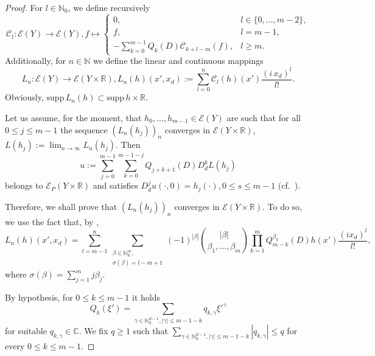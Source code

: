 \documentclass[a4paper,10pt]{amsart}
\newtheorem*{crucial lemma}{Lemma \ref{lem:nice polynomial2}}
\theoremstyle{definition}
\newcommand{\R}{\mathbb{R}}
\newcommand{\C}{\mathbb{C}}
\newcommand{\N}{\mathbb{N}}
\newcommand{\supp}{\mbox{supp}\,}
\begin{document}
\begin{proof}
    For $l\in \N_0$, we define recursively
	\[\mathscr{C}_l:\mathscr{E}(Y)\rightarrow \mathscr{E}(Y), f\mapsto\begin{cases}
		0, &l\in\{0,\ldots,m-2\},\\
		f, &l=m-1,\\
		-\sum_{k=0}^{m-1}Q_k(D)\mathscr{C}_{k+l-m}(f), &l\geq m.
	\end{cases}\]
	Additionally, for $n\in\N$ we define the linear and continuous mappings
	\[L_n:\mathscr{E}(Y)\rightarrow \mathscr{E}(Y\times\R), L_n(h)(x',x_d):=\sum_{l=0}^n\mathscr{C}_{l}(h)(x')\frac{(i\,x_d)^l}{l!}.\]
    Obviously, $\supp L_n(h)\subset\supp h\times\R$.

    Let us assume, for the moment, that $h_0,\ldots,h_{m-1}\in \mathscr{E}(Y)$ are such that for all $0\leq j\leq m-1$ the sequence $(L_n(h_j))_n$ converges in $\mathscr{E}(Y\times\R)$, $L(h_j):=\lim_{n\rightarrow\infty}L_n(h_j)$. Then
    \[u:=\sum_{j=0}^{m-1}\sum_{k=0}^{m-1-j}Q_{j+k+1}(D)D_d^kL(h_j)\]
    belongs to $\mathscr{E}_P(Y\times \R)$ and satisfies $D_d^j u(\cdot,0)=h_j(\cdot), 0\leq s\leq m-1$ (cf.~\cite[Section 4]{Kalmes2021}).
    
    Therefore, we shall prove that $(L_n(h_j))_n$ converges in $\mathscr{E}(Y\times\R)$. To do so, we use the fact that, by \cite[Remark 1]{Kalmes2021},
	\[L_n(h)(x',x_d)=\sum_{l=m-1}^n\sum\limits_{\substack{\beta\in\N_0^m,\\ \sigma(\beta)=l-m+1}}(-1)^{|\beta|}\binom{|\beta|}{\beta_1,\ldots,\beta_m}\prod_{k=1}^m Q_{m-k}^{\beta_k}(D)h(x') \frac{(ix_d)^l}{l!},\]
	where $\sigma(\beta)=\sum_{j=1}^m j\beta_j$.

	By hypothesis, for $0\leq k\leq m-1$ it holds 
	$$Q_k(\xi')=\sum_{\gamma\in\N_0^{d-1}, |\gamma|\leq m-1-k}q_{k,\gamma}\xi'^\gamma$$
	for suitable $q_{k,\gamma}\in\C$. We fix $q\geq 1$ such that $\sum_{\gamma\in\N_0^{d-1}, |\gamma|\leq m-1-k}|q_{k,\gamma}|\leq q$ for every $0\leq k\leq m-1$.
	

\end{proof}
\end{document}
